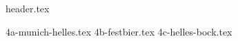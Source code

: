 \clearpage
{}
\divisorLine
{header.tex}
\begin{multicols*}{2}
{4a-munich-helles.tex}
{4b-festbier.tex}
{4c-helles-bock.tex}
\end{multicols*}